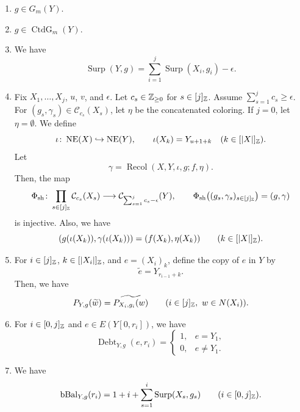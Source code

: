 \begin{lemma}
\begin{enumerate}
\item\label{c:shell-bounded} $g\in G_m(Y)$.
\item\label{c:shell-connected} $g\in\operatorname{CtdG}_m(Y)$.
\item\label{c:shell-residual} We have
\[
 \operatorname{Surp}(Y,g)=\sum_{i=1}^j\operatorname{Surp}(X_i,g_i)-\epsilon.
\]
\item\label{c:shell-recolor} Fix $X_1,\ldots,X_j$, $u$, $v$, and $\epsilon$.
Let $c_s\in\mathbb Z_{\ge0}$ for $s\in[j]_{\mathbb Z}$.
Assume $\sum_{s=1}^j c_s\ge\epsilon$.
For $(g_s,\gamma_s)\in\mathcal C_{c_s}(X_s)$, let $\eta$ be the concatenated coloring.
If $j=0$, let $\eta=\emptyset$.
We define
\[
 \iota\colon\operatorname{NE}(X)\hookrightarrow\operatorname{NE}(Y),
 \qquad\iota(X_k)=Y_{u+1+k}\quad(k\in[|X|]_{\mathbb Z}).
\]
Let
\begin{equation}\label{eq:shell-recolor}
 \gamma=\operatorname{Recol}(X,Y,\iota,g;f,\eta).
\end{equation}
Then, the map
\[
 \Phi_{\mathrm{sh}}\colon
 \prod_{s\in[j]_{\mathbb Z}}\mathcal C_{c_s}(X_s)
 \longrightarrow\mathcal C_{\sum_{s=1}^j c_s-\epsilon}(Y),
 \qquad \Phi_{\mathrm{sh}}\bigl((g_s,\gamma_s)_{s\in[j]_{\mathbb Z}}\bigr)=(g,\gamma)
\]
is injective. Also, we have
\[
 (g(\iota(X_k)),\gamma(\iota(X_k)))=(f(X_k),\eta(X_k))
 \qquad(k\in[|X|]_{\mathbb Z}).
\]
\item\label{c:shell-copy-precursor} For $i\in[j]_{\mathbb Z}$, $k\in[|X_i|]_{\mathbb Z}$, and $e=(X_i)_k$, define the copy of $e$ in $Y$ by
\begin{equation}\label{eq:shell-edge-copy}
 \widetilde e=Y_{r_{i-1}+k}.
\end{equation}
Then, we have
\begin{equation}\label{eq:shell-copy-precursor}
 P_{Y,g}(\widetilde w)=\widetilde{P_{X_i,g_i}(w)}
 \qquad(i\in[j]_{\mathbb Z},\ w\in N(X_i)).
\end{equation}
\item\label{c:shell-boundary-debts} For $i\in[0,j]_{\mathbb Z}$ and $e\in E(Y[0,r_i])$, we have
\[
 \operatorname{Debt}_{Y,g}(e,r_i)=
 \begin{cases}
 1,&e=Y_1,\\
 0,&e\ne Y_1.
 \end{cases}
\]
\item\label{c:shell-boundary-balances} We have
\[
 \operatorname{bBal}_{Y,g}(r_i)
 =1+i+\sum_{s=1}^i\operatorname{Surp}(X_s,g_s)
 \qquad(i\in[0,j]_{\mathbb Z}).
\]
\end{enumerate}
\end{lemma}
